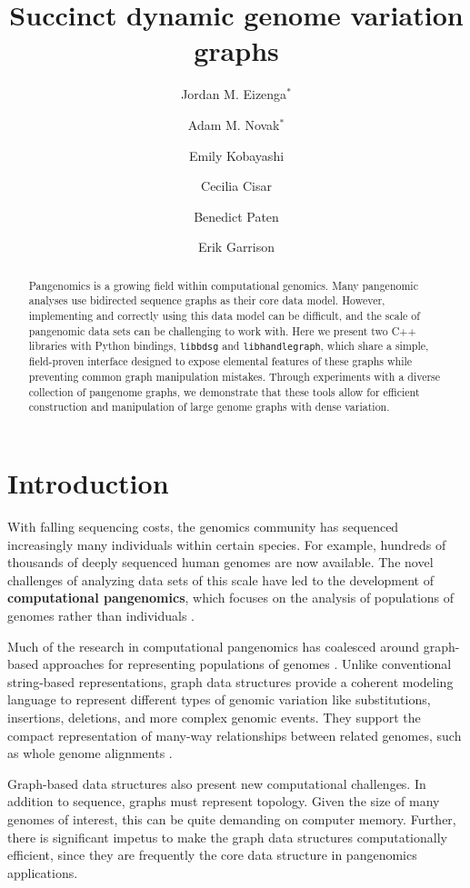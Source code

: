 \documentclass{article}
\title{Succinct dynamic genome variation graphs} %
\author{Jordan M. Eizenga$^*$ \and Adam M. Novak$^*$ \and Emily Kobayashi \and Cecilia Cisar \and Benedict Paten \and Erik Garrison}
\newcommand{\vocab}{\textbf}
\begin{document}
\maketitle

\begin{abstract}

Pangenomics is a growing field within computational genomics.
Many pangenomic analyses use bidirected sequence graphs as their core data model.
However, implementing and correctly using this data model can be difficult, and the scale of pangenomic data sets can be challenging to work with.
Here we present two C++ libraries with Python bindings, \texttt{libbdsg} and \texttt{libhandlegraph}, which share a simple, field-proven interface designed to expose elemental features of these graphs while preventing common graph manipulation mistakes.
Through experiments with a diverse collection of pangenome graphs, we demonstrate that these tools allow for efficient construction and manipulation of large genome graphs with dense variation.

\end{abstract}

\section{Introduction}


With falling sequencing costs, the genomics community has sequenced increasingly many individuals within certain species.
For example, hundreds of thousands of deeply sequenced human genomes are now available.
The novel challenges of analyzing data sets of this scale have led to the development of \vocab{computational pangenomics}, which focuses on the analysis of populations of genomes rather than individuals \cite{computational2016computational}.

Much of the research in computational pangenomics has coalesced around graph-based approaches for representing populations of genomes \cite{Paten_2017}.
Unlike conventional string-based representations, graph data structures provide a coherent modeling language to represent different types of genomic variation like substitutions, insertions, deletions, and more complex genomic events.
They support the compact representation of many-way relationships between related genomes, such as whole genome alignments \cite{kehr2014genome}.

Graph-based data structures also present new computational challenges.
In addition to sequence, graphs must represent topology.
Given the size of many genomes of interest, this can be quite demanding on computer memory.
Further, there is significant impetus to make the graph data structures computationally efficient, since they are frequently the core data structure in pangenomics applications.
\end{document}
